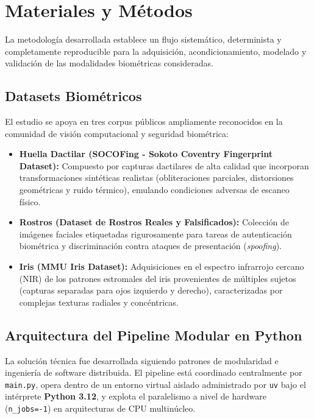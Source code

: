\section{Materiales y Métodos}\label{sec:method}

La metodología desarrollada establece un flujo sistemático, determinista y completamente reproducible para la adquisición, acondicionamiento, modelado y validación de las modalidades biométricas consideradas.

\subsection{Datasets Biométricos}
El estudio se apoya en tres corpus públicos ampliamente reconocidos en la comunidad de visión computacional y seguridad biométrica:

\begin{itemize}
    \item \textbf{Huella Dactilar (SOCOFing - Sokoto Coventry Fingerprint Dataset):} Compuesto por capturas dactilares de alta calidad que incorporan transformaciones sintéticas realistas (obliteraciones parciales, distorsiones geométricas y ruido térmico), emulando condiciones adversas de escaneo físico.
    \item \textbf{Rostros (Dataset de Rostros Reales y Falsificados):} Colección de imágenes faciales etiquetadas rigurosamente para tareas de autenticación biométrica y discriminación contra ataques de presentación (\textit{spoofing}).
    \item \textbf{Iris (MMU Iris Dataset):} Adquisiciones en el espectro infrarrojo cercano (NIR) de los patrones estromales del iris provenientes de múltiples sujetos (capturas separadas para ojos izquierdo y derecho), caracterizadas por complejas texturas radiales y concéntricas.
\end{itemize}

\subsection{Arquitectura del Pipeline Modular en Python}
La solución técnica fue desarrollada siguiendo patrones de modularidad e ingeniería de software distribuida. El pipeline está coordinado centralmente por \texttt{main.py}, opera dentro de un entorno virtual aislado administrado por \texttt{uv} bajo el intérprete \textbf{Python 3.12}, y explota el paralelismo a nivel de hardware (\texttt{n\_jobs=-1}) en arquitecturas de CPU multinúcleo.

